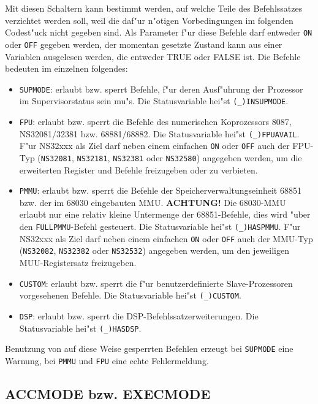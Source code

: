 \documentclass[12pt,a4paper,twoside]{report}
\makeatletter
\newcommand{\bb}[1]{{\bf #1}}
\newcommand{\tty}[1]{{\tt #1}}
\newcommand{\ttindex}[1]{\index{#1@{\tt #1}}}
\newcommand{\predefsym}[1]{{\tt (\_)#1}}
\makeatother
\begin{document}
Mit diesen Schaltern kann bestimmt werden, auf welche Teile des
Befehlssatzes verzichtet werden soll, weil die daf"ur n"otigen
Vorbedingungen im folgenden Codest"uck nicht gegeben sind.  Als
Parameter f"ur diese Befehle darf entweder \tty{ON} oder \tty{OFF} gegeben werden,
der momentan gesetzte Zustand kann aus einer Variablen ausgelesen
werden, die entweder TRUE oder FALSE ist.  Die Befehle bedeuten im einzelnen
folgendes:
\begin{itemize}
\item{\tty{SUPMODE}: erlaubt bzw. sperrt Befehle, f"ur deren Ausf"uhrung
      der Prozessor im Supervisorstatus sein mu"s.  Die Statusvariable
      hei"st \predefsym{INSUPMODE}.}
\item{\tty{FPU}: erlaubt bzw. sperrt die Befehle des numerischen Koprozessors
      8087, NS32081/32381 bzw. 68881/68882.  Die Statusvariable hei"st \predefsym{FPUAVAIL}.
      F"ur NS32xxx als Ziel darf neben einem einfachen \tty{ON} oder \tty{OFF}
      auch der FPU-Typ (\tty{NS32081}, \tty{NS32181}, \tty{NS32381} oder \tty{NS32580})
      angegeben werden, um die erweiterten Register und Befehle freizugeben oder
      zu verbieten.}
\item{\tty{PMMU}: erlaubt bzw. sperrt die Befehle der Speicherverwaltungseinheit
      68851 bzw. der im 68030 eingebauten MMU.  \bb{ACHTUNG!} Die 68030-MMU
      erlaubt nur eine relativ kleine Untermenge der 68851-Befehle, dies wird
      "uber den \tty{FULLPMMU}-Befehl gesteuert.  Die Statusvariable hei"st
      \predefsym{HASPMMU}. F"ur NS32xxx als Ziel darf neben einem einfachen \tty{ON}
      oder \tty{OFF} auch der MMU-Typ (\tty{NS32082}, \tty{NS32382} oder \tty{NS32532})
      angegeben werden, um den jeweiligen MUU-Registersatz freizugeben.}
\item{\tty{CUSTOM}: erlaubt bzw. sperrt die f"ur benutzerdefinierte Slave-Prozessoren
      vorgesehenen Befehle.  Die Statusvariable hei"st \predefsym{CUSTOM}.}
\item{\tty{DSP}: erlaubt bzw. sperrt die DSP-Befehlssatzerweiterungen. Die
      Statusvariable hei"st \predefsym{HASDSP}.}
\end{itemize}
Benutzung von auf diese Weise gesperrten Befehlen erzeugt bei \tty{SUPMODE}
eine Warnung, bei \tty{PMMU} und \tty{FPU} eine echte Fehlermeldung.


\subsection{ACCMODE bzw. EXECMODE}
\ttindex{ACCMODE}
\ttindex{EXECMODE}
\end{document}
